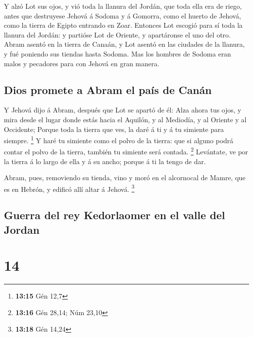  Y alzó Lot sus ojos, y vió toda la llanura del Jordán,
que toda ella era de riego, antes que destruyese Jehová á Sodoma y á
Gomorra, como el huerto de Jehová, como la tierra de Egipto entrando en
Zoar.  Entonces Lot escogió para sí toda la llanura del
Jordán: y partióse Lot de Oriente, y apartáronse el uno del otro.
 Abram asentó en la tierra de Canaán, y Lot asentó en las
ciudades de la llanura, y fué poniendo sus tiendas hasta Sodoma.
 Mas los hombres de Sodoma eran malos y pecadores para
con Jehová en gran manera.

\hypertarget{dios-promete-a-abram-el-pauxeds-de-canuxe1n}{%
\subsection{Dios promete a Abram el país de
Canán}\label{dios-promete-a-abram-el-pauxeds-de-canuxe1n}}

 Y Jehová dijo á Abram, después que Lot se apartó de él:
Alza ahora tus ojos, y mira desde el lugar donde estás hacia el Aquilón,
y al Mediodía, y al Oriente y al Occidente;  Porque toda
la tierra que ves, la daré á ti y á tu simiente para siempre.
\footnote{\textbf{13:15} Gén 12,7}  Y haré tu simiente
como el polvo de la tierra: que si alguno podrá contar el polvo de la
tierra, también tu simiente será contada. \footnote{\textbf{13:16} Gén
  28,14; Núm 23,10}  Levántate, ve por la tierra á lo
largo de ella y á su ancho; porque á ti la tengo de dar.

 Abram, pues, removiendo su tienda, vino y moró en el
alcornocal de Mamre, que es en Hebrón, y edificó allí altar á Jehová.
\footnote{\textbf{13:18} Gén 14,24}

\hypertarget{guerra-del-rey-kedorlaomer-en-el-valle-del-jordan}{%
\subsection{Guerra del rey Kedorlaomer en el valle del
Jordan}\label{guerra-del-rey-kedorlaomer-en-el-valle-del-jordan}}

\hypertarget{section-13}{%
\section{14}\label{section-13}}

